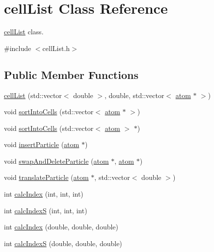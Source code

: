 \hypertarget{classcell_list}{}\section{cell\+List Class Reference}
\label{classcell_list}


\hyperlink{classcell_list}{cell\+List} class.  




{\ttfamily \#include $<$cell\+List.\+h$>$}

\subsection*{Public Member Functions}
\begin{DoxyCompactItemize}
\item 
\hyperlink{classcell_list_abae34854b8fcdeaaf2dc8de2ee47de94}{cell\+List} (std\+::vector$<$ double $>$, double, std\+::vector$<$ \hyperlink{classatom}{atom} $\ast$ $>$)
\item 
void \hyperlink{classcell_list_a58c091eb874dd1b88558bb92424e5ef2}{sort\+Into\+Cells} (std\+::vector$<$ \hyperlink{classatom}{atom} $\ast$ $>$)
\item 
void \hyperlink{classcell_list_ac4400cd9b80c3199e6482e8bcb1990c6}{sort\+Into\+Cells} (std\+::vector$<$ \hyperlink{classatom}{atom} $>$ $\ast$)
\item 
void \hyperlink{classcell_list_a56c0012eed483e47248f9065bfc70fce}{insert\+Particle} (\hyperlink{classatom}{atom} $\ast$)
\item 
void \hyperlink{classcell_list_a31caca1e8dd05c33215ac7495d55aeea}{swap\+And\+Delete\+Particle} (\hyperlink{classatom}{atom} $\ast$, \hyperlink{classatom}{atom} $\ast$)
\item 
void \hyperlink{classcell_list_a0d77368abdd5a4665ca2302b9a20509b}{translate\+Particle} (\hyperlink{classatom}{atom} $\ast$, std\+::vector$<$ double $>$)
\item 
int \hyperlink{classcell_list_aa6b843131cd487164a137571c7343cab}{calc\+Index} (int, int, int)
\item 
int \hyperlink{classcell_list_a9a5f8f84d17a8f0f7d3791aa64b75803}{calc\+Index\+S} (int, int, int)
\item 
int \hyperlink{classcell_list_a01dbd9a86ec24293d369be8d67b9df70}{calc\+Index} (double, double, double)
\item 
int \hyperlink{classcell_list_a7df926ebf382f281d15935550ffcba64}{calc\+Index\+S} (double, double, double)
\end{DoxyCompactItemize}
